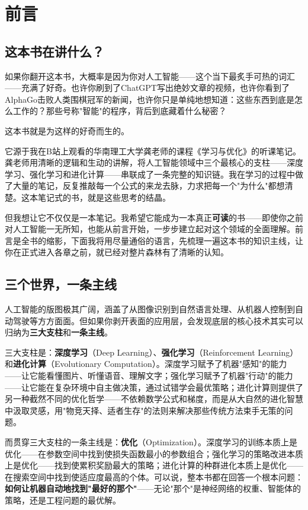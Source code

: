 \documentclass[lang=cn,zihao=-4,a4paper,fontset=windows]{beautybook}
\begin{document}
\frontmatter
{}

{%
\chapter*{前言}

\section*{这本书在讲什么？}

如果你翻开这本书，大概率是因为你对人工智能——这个当下最炙手可热的词汇——充满了好奇。也许你刷到了ChatGPT写出绝妙文章的视频，也许你看到了AlphaGo击败人类围棋冠军的新闻，也许你只是单纯地想知道：这些东西到底是怎么工作的？那些号称"智能"的程序，背后到底藏着什么秘密？

这本书就是为这样的好奇而生的。

它源于我在B站上观看的华南理工大学龚老师的课程《学习与优化》的听课笔记。龚老师用清晰的逻辑和生动的讲解，将人工智能领域中三个最核心的支柱——深度学习、强化学习和进化计算——串联成了一条完整的知识链。我在学习的过程中做了大量的笔记，反复推敲每一个公式的来龙去脉，力求把每一个"为什么"都想清楚。这本笔记式的书，就是这些思考的结晶。

但我想让它不仅仅是一本笔记。我希望它能成为一本真正\textbf{可读}的书——即使你之前对人工智能一无所知，也能从前言开始，一步步建立起对这个领域的全面理解。前言是全书的缩影，下面我将用尽量通俗的语言，先梳理一遍这本书的知识主线，让你在正式进入各章之前，就已经对整片森林有了清晰的认知。

\section*{三个世界，一条主线}

人工智能的版图极其广阔，涵盖了从图像识别到自然语言处理、从机器人控制到自动驾驶等方方面面。但如果你剥开表面的应用层，会发现底层的核心技术其实可以归纳为\textbf{三大支柱}和\textbf{一条主线}。

三大支柱是：\textbf{深度学习}（Deep Learning）、\textbf{强化学习}（Reinforcement Learning）和\textbf{进化计算}（Evolutionary Computation）。深度学习赋予了机器"感知"的能力——让它能看懂图片、听懂语音、理解文字；强化学习赋予了机器"行动"的能力——让它能在复杂环境中自主做决策，通过试错学会最优策略；进化计算则提供了另一种截然不同的优化哲学——不依赖数学公式和梯度，而是从大自然的进化智慧中汲取灵感，用"物竞天择、适者生存"的法则来解决那些传统方法束手无策的问题。

而贯穿三大支柱的一条主线是：\textbf{优化}（Optimization）。深度学习的训练本质上是优化——在参数空间中找到使损失函数最小的参数组合；强化学习的策略改进本质上是优化——找到使累积奖励最大的策略；进化计算的种群进化本质上是优化——在搜索空间中找到使适应度最高的个体。可以说，整本书都在回答一个根本问题：\textbf{如何让机器自动地找到"最好的那个"}——无论"那个"是神经网络的权重、智能体的策略，还是工程问题的最优解。

}
\end{document}
